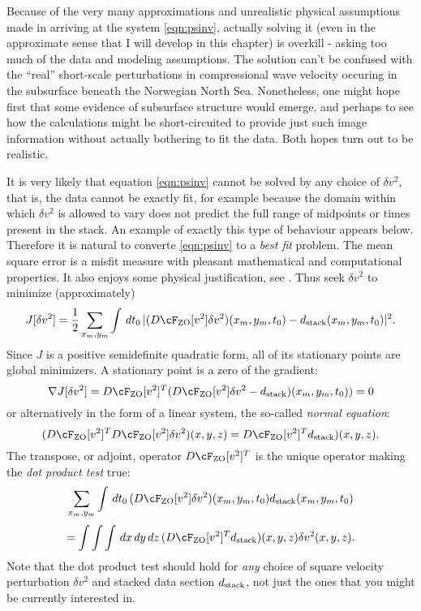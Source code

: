 Because of the very many approximations and unrealistic physical assumptions made in arriving at the system \ref{eqn:psinv}, actually solving it (even in the approximate sense that I will develop in this chapter) is overkill - asking too much of the data and modeling assumptions. The solution can't be confused with the ``real'' short-scale perturbations in compressional wave velocity occuring in the subsurface beneath the Norwegian North Sea. Nonetheless, one might hope first that some evidence of subsurface structure would emerge, and perhaps to see how the calculations might be short-circuited to provide just such image information without actually bothering to fit the data. Both hopes turn out to be realistic.
 
It is very likely that equation \ref{eqn:psinv} cannot be solved by any choice of $\delta v^2$, that is, the data cannot be exactly fit, for example because the domain within which $\delta v^2$ is allowed to vary does not predict the full range of midpoints or times present in the stack. An example of exactly this type of behaviour appears below. Therefore it is natural to converte \ref{eqn:psinv} to a {\em best fit} problem. The mean square error is a misfit measure with pleasant mathematical and computational properties. It also enjoys some physical justification, see \cite{SantosaSymes:00}. Thus seek $\delta v^2$ to minimize (approximately)
\begin{equation}
\label{eqn:psinvls}
J[\delta v^2] =\frac{1}{2} \sum_{x_m,y_m}\int \,dt_0\,|(D\cF_{\rm ZO}[v^2]\delta v^2)(x_m,y_m,t_0) -  d_{\rm stack}(x_m,y_m,t_0)|^2. 
\end{equation}
Since $J$ is a positive semidefinite quadratic form, all of its stationary points are global minimizers. A stationary point is a zero of the gradient:
\begin{equation}
\label{eqn:psinvgrad}
\nabla J[\delta v^2] = D\cF_{\rm ZO}[v^2]^T( D\cF_{\rm ZO}[v^2]\delta v^2 -  d_{\rm stack})(x_m,y_m,t_0)) = 0
\end{equation}
or alternatively in the form of a linear system, the so-called {\em normal equation}:
\begin{equation}
\label{eqn:psinvnorm}
(D\cF_{\rm ZO}[v^2]^T D\cF_{\rm ZO}[v^2]\delta v^2) (x,y,z) = D\cF_{\rm ZO}[v^2]^T d_{\rm stack})(x,y,z).
\end{equation}
The transpose, or adjoint, operator $D\cF_{\rm ZO}[v^2]^T$ is the unique operator making the {\em dot product test} true:
\[
\sum_{x_m,y_m}\int \,dt_0\,(D\cF_{\rm ZO}[v^2]\delta v^2)(x_m,y_m,t_0)d_{\rm stack}(x_m,y_m,t_0) 
\]
\begin{equation}
\label{eqn:dotprodtest}
=\int\int\int \,dx\,dy\,dz\,(D\cF_{\rm ZO}[v^2]^T d_{\rm stack})(x,y,z)\delta v^2(x,y,z).
\end{equation}
Note that the dot product test should hold for {\em any} choice of square velocity perturbation $\delta v^2$ and stacked data section $d_{\rm stack}$, not just the ones that you might be currently interested in.

